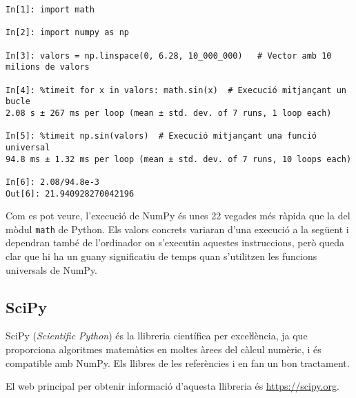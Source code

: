 \begin{lstlisting}
In[1]: import math

In[2]: import numpy as np

In[3]: valors = np.linspace(0, 6.28, 10_000_000)   # Vector amb 10 milions de valors

In[4]: %timeit for x in valors: math.sin(x)  # Execució mitjançant un bucle
2.08 s ± 267 ms per loop (mean ± std. dev. of 7 runs, 1 loop each)

In[5]: %timeit np.sin(valors)  # Execució mitjançant una funció universal
94.8 ms ± 1.32 ms per loop (mean ± std. dev. of 7 runs, 10 loops each)

In[6]: 2.08/94.8e-3
Out[6]: 21.940928270042196
\end{lstlisting}

Com es pot veure, l'execució de NumPy és unes 22 vegades més ràpida que la del mòdul \texttt{math} de Python. Els valors concrets variaran d'una execució a la següent i dependran també de l'ordinador on s'executin aquestes instruccions, però queda clar que hi ha un guany significatiu de temps quan s'utilitzen les funcions universals de NumPy.


\subsection{SciPy}

SciPy (\textit{Scientific Python}) és la llibreria científica per exceŀlència, ja que proporciona algoritmes  matemàtics en moltes àrees del càlcul numèric, i és compatible amb NumPy. Els llibres de les referències \cite{JOH} i \cite{HIL} en fan un bon tractament.

El  web principal per obtenir informació d'aquesta llibreria és \href{https://scipy.org/}{https:/\!\!/scipy.org}.

